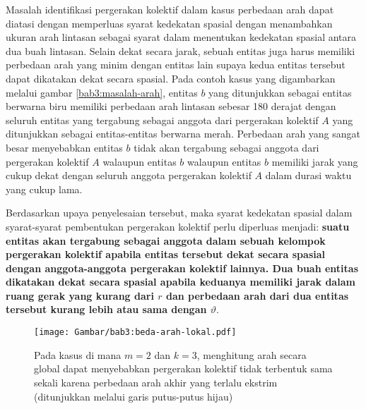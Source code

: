 Masalah identifikasi pergerakan kolektif dalam kasus perbedaan arah dapat diatasi dengan memperluas syarat kedekatan spasial dengan menambahkan ukuran arah lintasan sebagai syarat dalam menentukan kedekatan spasial antara dua buah lintasan. Selain dekat secara jarak, sebuah entitas juga harus memiliki perbedaan arah yang minim dengan entitas lain supaya kedua entitas tersebut dapat dikatakan dekat secara spasial. Pada contoh kasus yang digambarkan melalui gambar \ref{bab3:masalah-arah}, entitas $b$ yang ditunjukkan sebagai entitas berwarna biru memiliki perbedaan arah lintasan sebesar 180 derajat dengan seluruh entitas yang tergabung sebagai anggota dari pergerakan kolektif $A$ yang ditunjukkan sebagai entitas-entitas berwarna merah. Perbedaan arah yang sangat besar menyebabkan entitas $b$ tidak akan tergabung sebagai anggota dari pergerakan kolektif $A$ walaupun entitas $b$ walaupun entitas $b$ memiliki jarak yang cukup dekat dengan seluruh anggota pergerakan kolektif $A$ dalam durasi waktu yang cukup lama.

Berdasarkan upaya penyelesaian tersebut, maka syarat kedekatan spasial dalam syarat-syarat pembentukan pergerakan kolektif perlu diperluas menjadi: \textbf{suatu entitas akan tergabung sebagai anggota dalam sebuah kelompok pergerakan kolektif apabila entitas tersebut dekat secara spasial dengan anggota-anggota pergerakan kolektif lainnya. Dua buah entitas dikatakan dekat secara spasial apabila keduanya memiliki jarak dalam ruang gerak yang kurang dari $r$ dan perbedaan arah dari dua entitas tersebut kurang lebih atau sama dengan $\vartheta$}.

\begin{figure}[t]
    \centering
    \texttt{[image: Gambar/bab3:beda-arah-lokal.pdf]}
    \caption[Masalah identifikasi pada penghitungan arah secara global]{Pada kasus di mana $m = 2$ dan $k = 3$, menghitung arah secara global dapat menyebabkan pergerakan kolektif tidak terbentuk sama sekali karena perbedaan arah akhir yang terlalu ekstrim (ditunjukkan melalui garis putus-putus hijau)}
    \label{bab3:beda-arah-lokal}
\end{figure}

